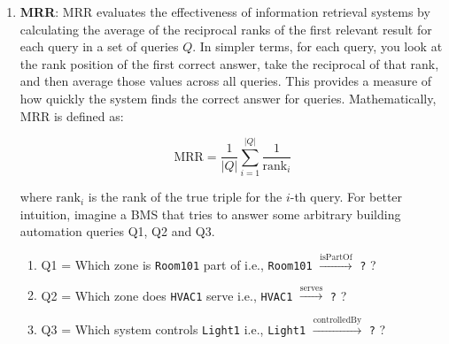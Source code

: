 \begin{enumerate}
    \item 
    \textbf{\ac{MRR}}: \ac{MRR} evaluates the effectiveness of information retrieval systems by calculating the average of the reciprocal ranks of the first relevant result for each query in a set of queries \( Q \). In simpler terms, for each query, you look at the rank position of the first correct answer, take the reciprocal of that rank, and then average those values across all queries. This provides a measure of how quickly the system finds the correct answer for queries. Mathematically, \ac{MRR} is defined as:
    
    \begin{equation}
    \label{eq:mrr}
    \text{MRR} = \frac{1}{|Q|} \sum_{i=1}^{|Q|} \frac{1}{\text{rank}_i}
    \end{equation}
    
    where \(\text{rank}_i\) is the rank of the true triple for the \(i\)-th query. For better intuition, imagine a \ac{BMS} that tries to answer some arbitrary building automation queries Q1, Q2 and Q3.

    \begin{enumerate}
        \item 
        Q1 = Which zone is \texttt{Room101} part of i.e., \texttt{Room101} $\xrightarrow{\text{isPartOf}}$ \texttt{?} ?

        \item 
        Q2 = Which zone does \texttt{HVAC1} serve i.e., \texttt{HVAC1} $\xrightarrow{\text{serves}}$ \texttt{?} ?

        \item 
        Q3 = Which system controls \texttt{Light1} i.e., \texttt{Light1} $\xrightarrow{\text{controlledBy}}$ \texttt{?} ?
        

\end{enumerate}
\end{enumerate}

